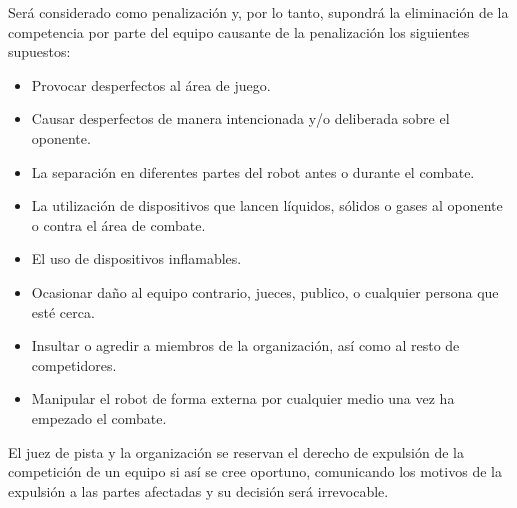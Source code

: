 \documentclass[12pt]{book}
\theoremstyle{definition}
\theoremstyle{remark}
\theoremstyle{plain}
\begin{document}
Será considerado como penalización y, por lo tanto, supondrá la eliminación de la competencia por parte del equipo causante de la penalización los siguientes supuestos: 
\begin{itemize}
 \item Provocar desperfectos al área de juego. 
 \item Causar desperfectos de manera intencionada y/o deliberada sobre el oponente.
 \item La separación en diferentes partes del robot antes o durante el combate.
 \item La utilización de dispositivos que lancen líquidos, sólidos o gases al oponente o contra el área de combate. 
 \item El uso de dispositivos inflamables. 
 \item Ocasionar daño al equipo contrario, jueces, publico, o cualquier persona que esté cerca. 
 \item Insultar o agredir a miembros de la organización, así como al resto de competidores. 
 \item Manipular el robot de forma externa por cualquier medio una vez ha empezado el combate. 
\end{itemize}
El juez de pista y la organización se reservan el derecho de expulsión de la competición de un equipo si así 
se cree oportuno, comunicando los motivos de la expulsión a las partes afectadas y su decisión será irrevocable.
\end{document}
